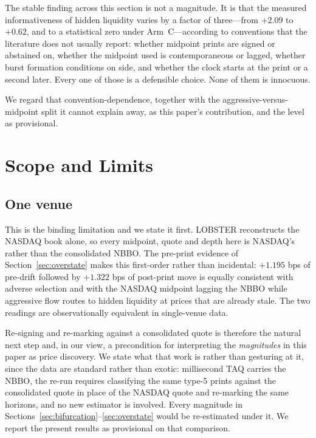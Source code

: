 \documentclass[11pt]{article}
\begin{document}
The stable finding across this section is not a magnitude. It is that the measured
informativeness of hidden liquidity varies by a factor of three---from $+2.09$ to $+0.62$, and
to a statistical zero under Arm~C---according to conventions that the literature does not
usually report: whether midpoint prints are signed or abstained on, whether the midpoint used
is contemporaneous or lagged, whether burst formation conditions on side, and whether the
clock starts at the print or a second later. Every one of those is a defensible choice. None
of them is innocuous.

We regard that convention-dependence, together with the aggressive-versus-midpoint split it
cannot explain away, as this paper's contribution, and the level as provisional.

\section{Scope and Limits}
\label{sec:limits}

\subsection{One venue}

This is the binding limitation and we state it first. LOBSTER reconstructs the NASDAQ book
alone, so every midpoint, quote and depth here is NASDAQ's rather than the consolidated
NBBO. The pre-print evidence of Section~\ref{sec:overstate} makes this first-order rather
than incidental: $+1.195$ bps of pre-drift followed by $+1.322$ bps of post-print move is
equally consistent with adverse selection and with the NASDAQ midpoint lagging the NBBO
while aggressive flow routes to hidden liquidity at prices that are already stale. The two
readings are observationally equivalent in single-venue data.

Re-signing and re-marking against a consolidated quote is therefore the natural next step
and, in our view, a precondition for interpreting the \emph{magnitudes} in this paper as
price discovery. We state what that work is rather than gesturing at it, since the data are
standard rather than exotic: millisecond TAQ carries the NBBO, the re-run requires
classifying the same type-5 prints against the consolidated quote in place of the NASDAQ
quote and re-marking the same horizons, and no new estimator is involved. Every magnitude
in Sections~\ref{sec:bifurcation}--\ref{sec:overstate} would be re-estimated under it. We
report the present results as provisional on that comparison.
\end{document}
